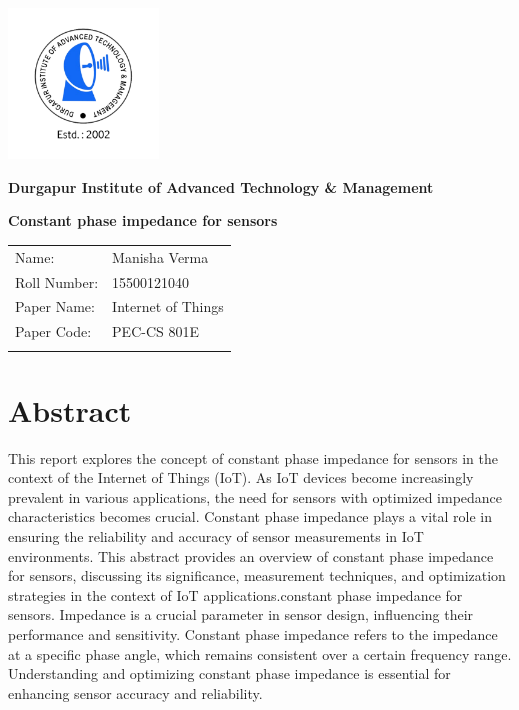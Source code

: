 \documentclass[12pt]{report}
\begin{document}
\begin{titlepage}
    \centering
    \includegraphics[width=4cm]{transparent logo.png}

    \Large \textbf{Durgapur Institute of Advanced Technology \& Management}
    \vspace{6cm}

    \Large \textbf{Constant phase impedance for sensors}\par
    \vspace{1cm}
    
    \large
    \begin{tabular}{l l}
        Name: & Manisha Verma \\
        Roll Number: & 15500121040 \\
        Paper Name: & Internet of Things \\
        Paper Code: & PEC-CS 801E \\ \\
    \end{tabular}
\end{titlepage}

\tableofcontents

\newpage
\section*{Abstract}
This report explores the concept of constant phase impedance for sensors in the context of the Internet of Things (IoT). As IoT devices become increasingly prevalent in various applications, the need for sensors with optimized impedance characteristics becomes crucial. Constant phase impedance plays a vital role in ensuring the reliability and accuracy of sensor measurements in IoT environments. This abstract provides an overview of constant phase impedance for sensors, discussing its significance, measurement techniques, and optimization strategies in the context of IoT applications.constant phase impedance for sensors. Impedance is a crucial parameter in sensor design, influencing their performance and sensitivity. Constant phase impedance refers to the impedance at a specific phase angle, which remains consistent over a certain frequency range. Understanding and optimizing constant phase impedance is essential for enhancing sensor accuracy and reliability.
\end{document}

